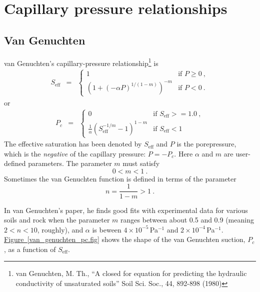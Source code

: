 \documentclass[12pt]{report}
\begin{document}
\section{Capillary pressure relationships}
\label{pc.sec}

\subsection{Van Genuchten}

van Genuchten's capillary-pressure relationship\footnote{van
  Genuchten, M. Th., ``A closed for equation for predicting the
  hydraulic conductivity of unsaturated soils'' Soil Sci. Soc., 44,
  892-898 (1980)} is
\begin{eqnarray}
S_{\mathrm{eff}} & = & \left\{
\begin{array}{ll}
1 & \mbox{if } P \geq 0 \ , \\
(1 + (-\alpha P)^{1/(1-m)})^{-m} & \mbox{if } P < 0\ .
\label{vg.cap.eqn}
\end{array}
\right.
\end{eqnarray}
or
\begin{eqnarray}
P_{c} & = & \left\{
\begin{array}{ll}
0 & \mbox{if } S_{\mathrm{eff}} >= 1.0 \ , \\
\frac{1}{\alpha} (S_{\mathrm{eff}}^{-1/m} - 1)^{1 - m} & \mbox{if }
S_{\mathrm{eff}} < 1
\end{array}
\right.
\end{eqnarray}
The effective saturation has been denoted by $S_{\mathrm{eff}}$ and
$P$ is the porepressure, which is the {\em negative} of the capillary
pressure: $P = -P_{c}$.  Here $\alpha$ and $m$ are user-defined parameters.  The
parameter $m$ must satisfy
\begin{equation}
0 < m < 1 \ .
\end{equation}
Sometimes the van
Genuchten function is defined in terms of the parameter
\begin{equation}
n = \frac{1}{1 - m} > 1 \ .
\end{equation}

In van Genuchten's paper, he finds good fits with experimental data
for various soils and rock when the parameter $m$ ranges between about
0.5 and 0.9 (meaning $2<n<10$, roughly), and $\alpha$ is beween
$4\times 10^{-5}$\,Pa$^{-1}$ and $2\times 10^{-4}$\,Pa$^{-1}$.
\hyperref[van_genuchten_pc.fig]{Figure~\ref*{van_genuchten_pc.fig}}
shows the shape of the van Genuchten suction, $P_{c}$, as a function
of $S_{\mathrm{eff}}$.
\end{document}

